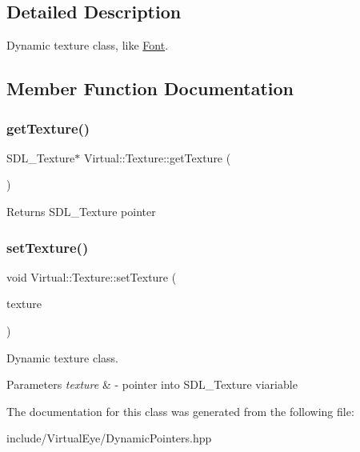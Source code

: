 \subsection{Detailed Description}
Dynamic texture class, like \hyperlink{class_virtual_1_1_font}{Font}. 

\subsection{Member Function Documentation}
\hypertarget{class_virtual_1_1_texture_a5c870d3c9b6db63922aa5cf451cd3422}{}\label{class_virtual_1_1_texture_a5c870d3c9b6db63922aa5cf451cd3422} 
\subsubsection{\texorpdfstring{get\+Texture()}{getTexture()}}
{\footnotesize\ttfamily S\+D\+L\+\_\+\+Texture$\ast$ Virtual\+::\+Texture\+::get\+Texture (\begin{DoxyParamCaption}{ }\end{DoxyParamCaption})}

\begin{DoxyReturn}{Returns}
S\+D\+L\+\_\+\+Texture pointer 
\end{DoxyReturn}
\hypertarget{class_virtual_1_1_texture_a8e0ffa6f92bfb5afab975a59f2b3b92f}{}\label{class_virtual_1_1_texture_a8e0ffa6f92bfb5afab975a59f2b3b92f} 
\subsubsection{\texorpdfstring{set\+Texture()}{setTexture()}}
{\footnotesize\ttfamily void Virtual\+::\+Texture\+::set\+Texture (\begin{DoxyParamCaption}\item[{S\+D\+L\+\_\+\+Texture $\ast$}]{texture }\end{DoxyParamCaption})}



Dynamic texture class. 


\begin{DoxyParams}{Parameters}
{\em texture} & -\/ pointer into S\+D\+L\+\_\+\+Texture viariable \\
\hline
\end{DoxyParams}


The documentation for this class was generated from the following file\+:\begin{DoxyCompactItemize}
\item 
include/\+Virtual\+Eye/Dynamic\+Pointers.\+hpp\end{DoxyCompactItemize}
